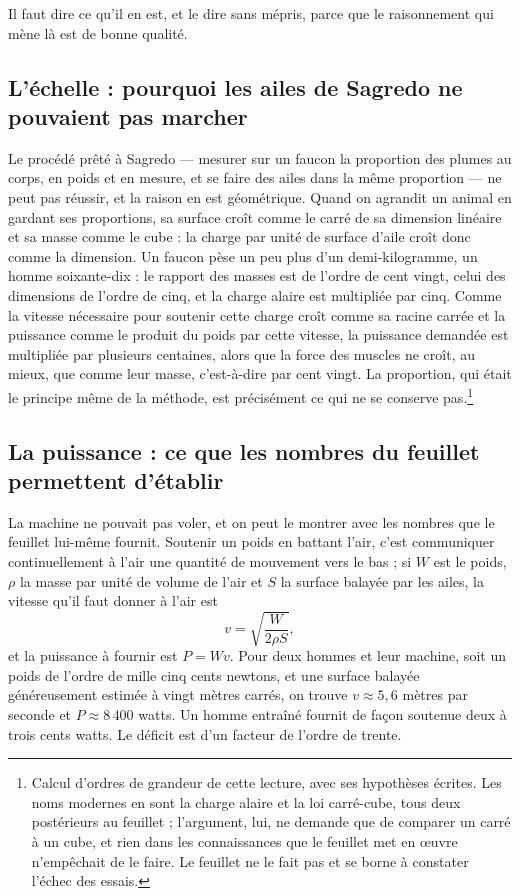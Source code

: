 \documentclass[11pt,a4paper]{article}
\begin{document}
Il faut dire ce qu'il en est, et le dire sans mépris, parce que le raisonnement
qui mène là est de bonne qualité.

\subsection*{L'échelle : pourquoi les ailes de Sagredo ne pouvaient pas marcher}

Le procédé prêté à Sagredo — mesurer sur un faucon la proportion des plumes au
corps, en poids et en mesure, et se faire des ailes dans la même proportion — ne
peut pas réussir, et la raison en est géométrique. Quand on agrandit un animal en
gardant ses proportions, sa surface croît comme le carré de sa dimension
linéaire et sa masse comme le cube : la charge par unité de surface d'aile croît
donc comme la dimension. Un faucon pèse un peu plus d'un demi-kilogramme, un
homme soixante-dix : le rapport des masses est de l'ordre de cent vingt, celui
des dimensions de l'ordre de cinq, et la charge alaire est multipliée par cinq.
Comme la vitesse nécessaire pour soutenir cette charge croît comme sa racine
carrée et la puissance comme le produit du poids par cette vitesse, la puissance
demandée est multipliée par plusieurs centaines, alors que la force des muscles
ne croît, au mieux, que comme leur masse, c'est-à-dire par cent vingt. La
proportion, qui était le principe même de la méthode, est précisément ce qui ne
se conserve pas.\footnote{Calcul d'ordres de grandeur de cette lecture, avec ses
hypothèses écrites. Les noms modernes en sont la charge alaire et la loi
carré-cube, tous deux postérieurs au feuillet ; l'argument, lui, ne demande que
de comparer un carré à un cube, et rien dans les connaissances que le feuillet
met en œuvre n'empêchait de le faire. Le feuillet ne le fait pas et se borne à
constater l'échec des essais.}

\subsection*{La puissance : ce que les nombres du feuillet permettent d'établir}

La machine ne pouvait pas voler, et on peut le montrer avec les nombres que le
feuillet lui-même fournit. Soutenir un poids en battant l'air, c'est communiquer
continuellement à l'air une quantité de mouvement vers le bas ; si $W$ est le
poids, $\rho$ la masse par unité de volume de l'air et $S$ la surface balayée par
les ailes, la vitesse qu'il faut donner à l'air est
\[ v = \sqrt{\frac{W}{2\rho S}}, \]
et la puissance à fournir est $P = W v$. Pour deux hommes et leur machine, soit
un poids de l'ordre de mille cinq cents newtons, et une surface balayée
généreusement estimée à vingt mètres carrés, on trouve $v \approx 5{,}6$ mètres
par seconde et $P \approx 8\,400$ watts. Un homme entraîné fournit de façon
soutenue deux à trois cents watts. Le déficit est d'un facteur de l'ordre de
trente.
\end{document}
